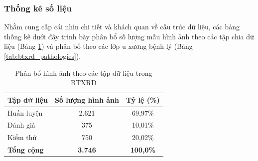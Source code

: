 \subsubsection{Thống kê số liệu}
Nhằm cung cấp cái nhìn chi tiết và khách quan về cấu trúc dữ liệu, các bảng thống kê dưới đây trình bày phân bổ số lượng mẫu hình ảnh theo các tập chia dữ liệu (Bảng \ref{tab:btxrd_splits}) và phân bổ theo các lớp u xương bệnh lý (Bảng \ref{tab:btxrd_pathologies}).

\begin{table}[htbp]
\centering
\begin{tabular}{|l|c|c|}
\hline
\textbf{Tập dữ liệu} & \textbf{Số lượng hình ảnh} & \textbf{Tỷ lệ (\%)} \\ \hline
Huấn luyện           & 2.621                       & 69,97\%             \\ \hline
Đánh giá         & 375                         & 10,01\%             \\ \hline
Kiểm thử               & 750                         & 20,02\%             \\ \hline
\textbf{Tổng cộng}            & \textbf{3.746}              & \textbf{100,0\%}    \\ \hline
\end{tabular}
\caption{Phân bổ hình ảnh theo các tập dữ liệu trong BTXRD}
\label{tab:btxrd_splits}
\end{table}

